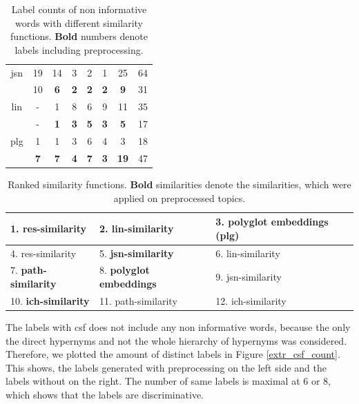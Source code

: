 {\begin{table}[h]
\begin{tabular}{c|c|c|c|c|c|c|c}
		\hline
		jsn& 19		&14				  &3	   &2      &1       &25 &64\\
		&10 		&\textbf{6}	 &\textbf{2}  &\textbf{2} &\textbf{2} &\textbf{9} &31\\
		\hline
		lin& -		&1				  &8	   &6      &9       &11 &35\\
		& -	 	&\textbf{1}	 &\textbf{3}  &\textbf{5} &\textbf{3} &\textbf{5} &17\\
		\hline
		plg& 1		&1		 &3	   &6      &4       &3 &18\\
		& \textbf{7}&\textbf{7}	 &\textbf{4}  &\textbf{7} &\textbf{3} &\textbf{19} & 47\\
	\end{tabular}
	\label{tab: label_count_non_informative}
	\caption[Label counts of non informative words]{Label counts of non informative words with different similarity functions. \textbf{Bold} numbers denote labels including preprocessing.}
\end{table}
\begin{table}[h]
	\begin{tabular}{|l|l|l|}
		\hline
		1. \textbf{res-similarity} &2. \textbf{lin-similarity} &
		3. polyglot embeddings (plg) \\ 
		\hline
		4. res-similarity&5. \textbf{jsn-similarity}& 6. lin-similarity\\
		\hline
		7. \textbf{path-similarity} &8. \textbf{polyglot embeddings} &9. jsn-similarity \\ 
		\hline
		10. \textbf{ich-similarity}&11. path-similarity  &12. ich-similarity\\
		\hline
	\end{tabular}
\caption[Ranked similarity functions for extrinsic labeling]{Ranked similarity functions. \textbf{Bold} similarities denote the similarities, which were applied on preprocessed topics.}
\label{tab:ranked_non_info}
\end{table}
The labels with \ac{csf} does not include any non informative words, because the only the direct hypernyms and not the whole hierarchy of hypernyms was considered. Therefore, we plotted the amount of distinct labels in Figure \ref{extr_csf_count}. This shows, the labels generated with preprocessing on the left side and the labels without on the right. The number of same labels is maximal at 6 or 8, which shows that the labels are discriminative.
\begin{figure}[h]

\end{figure}}

